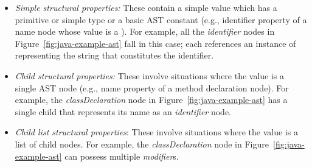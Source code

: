 \begin{itemize} [leftmargin=0.7in]
\item \textit{Simple structural properties:} These contain a simple value which has a primitive or simple type or a basic AST constant (e.g., identifier property of a name node whose value is a ).  For example, all the \textit{identifier} nodes in Figure~\ref{fig:java-example-ast} fall in this case; each references an instance of  representing the string that constitutes the identifier.
\item \textit{Child structural properties:} These involve situations where the value is a single AST node (e.g., name property of a method declaration node).  For example, the \textit{classDeclaration} node in Figure~\ref{fig:java-example-ast} has a single child that represents its name as an \textit{identifier} node.
\item \textit{Child list structural properties}: These involve situations where the value is a list of child nodes.  For example, the \textit{classDeclaration} node in Figure~\ref{fig:java-example-ast} can possess multiple \textit{modifier}s.
\end{itemize}

